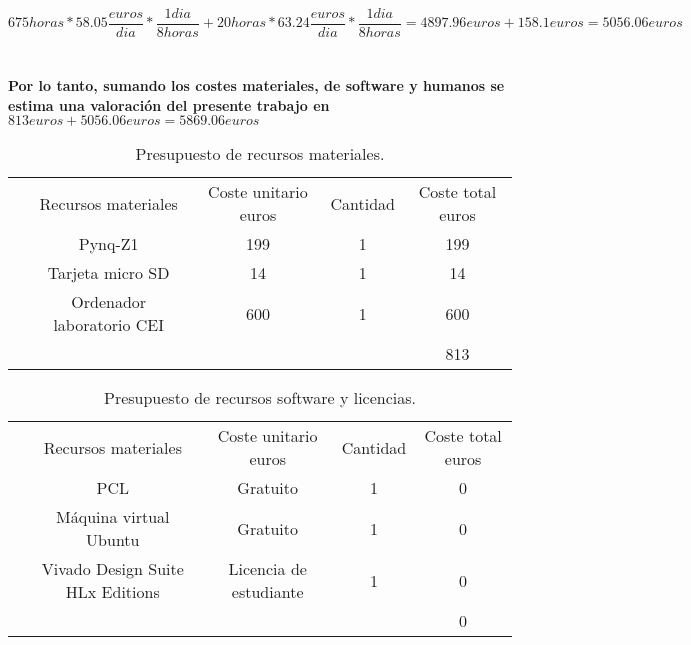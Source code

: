 $$675 horas * 58.05 \frac{ euros }{dia} * \frac{1 dia}{8 horas} + 20 horas * 63.24 \frac{ euros }{dia} * \frac{1 dia}{8 horas} =  4897.96 euros + 158.1 euros = 5056.06 euros$$
\\
\\
\textbf{Por lo tanto, sumando los costes materiales, de software y humanos se estima una valoración del presente trabajo en $813 euros+ 5056.06 euros= 5869.06 euros$}
\begin{table}[!htb]
\begin{tabular}{cccc|c|}
\cline{2-5}
\multicolumn{1}{c|}{} & \multicolumn{1}{c|}{Recursos materiales}       & \multicolumn{1}{c|}{Coste unitario euros} & Cantidad              & Coste total euros \\ \cline{2-5} 
\multicolumn{1}{c|}{} & \multicolumn{1}{c|}{Pynq-Z1}                   & \multicolumn{1}{c|}{199}              & 1                     & 199           \\ \cline{2-5} 
\multicolumn{1}{c|}{} & \multicolumn{1}{c|}{Tarjeta micro SD}          & \multicolumn{1}{c|}{14}               & 1                     & 14            \\ \cline{2-5} 
\multicolumn{1}{c|}{} & \multicolumn{1}{c|}{Ordenador laboratorio CEI} & \multicolumn{1}{c|}{600}              & 1                     & 600           \\ \cline{2-5} 
\multicolumn{1}{l}{}  & \multicolumn{1}{l}{}                           & \multicolumn{1}{l}{}                  & \multicolumn{1}{l|}{} & 813           \\ \cline{5-5} 
\end{tabular}
\caption{Presupuesto de recursos materiales.}
\label{coste_material}
\end{table}

\begin{table}[!htb]
\begin{tabular}{cccc|c|}
\cline{2-5}
\multicolumn{1}{c|}{} & \multicolumn{1}{c|}{Recursos materiales}              & \multicolumn{1}{c|}{Coste unitario euros}       & Cantidad              & Coste total euros \\ \cline{2-5} 
\multicolumn{1}{c|}{} & \multicolumn{1}{c|}{PCL}                              & \multicolumn{1}{c|}{Gratuito}               & 1                     & 0             \\ \cline{2-5} 
\multicolumn{1}{c|}{} & \multicolumn{1}{c|}{Máquina virtual Ubuntu}           & \multicolumn{1}{c|}{Gratuito}               & 1                     & 0             \\ \cline{2-5} 
\multicolumn{1}{c|}{} & \multicolumn{1}{c|}{Vivado Design Suite HLx Editions} & \multicolumn{1}{c|}{Licencia de estudiante} & 1                     & 0             \\ \cline{2-5} 
\multicolumn{1}{l}{}  & \multicolumn{1}{l}{}                                  & \multicolumn{1}{l}{}                        & \multicolumn{1}{l|}{} & 0             \\ \cline{5-5} 
\end{tabular}
\caption{Presupuesto de recursos software y licencias.}
\label{coste_software}
\end{table}

